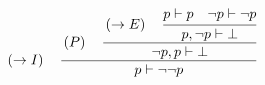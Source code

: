 \documentclass{standalone}
\begin{document}
$
\left(\rightarrow{}I\right)\quad
\cfrac{
  \left(P\right)\quad
  \cfrac{
    \left(\rightarrow{}E\right)\quad
    \cfrac{
      p\vdash{}p
      \quad
      \lnot{}p\vdash\lnot{}p
    }{
      p,\lnot{}p\vdash\bot
    }
  }{
    \lnot{}p,p\vdash\bot
  }
}{
  p\vdash{}\lnot\lnot{}p
}
$
\end{document}
